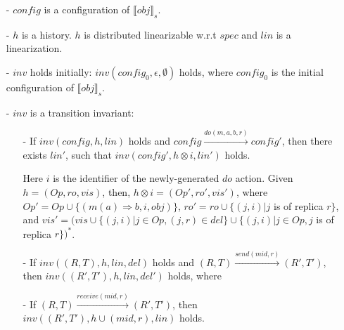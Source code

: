 \begin{itemize}
\setlength{\itemsep}{0.5pt}
\item[-] $\mathit{config}$ is a configuration of $\llbracket \mathit{obj} \rrbracket_s$.

\item[-] $h$ is a history. $h$ is distributed linearizable w.r.t $\mathit{spec}$ and $\mathit{lin}$ is a linearization.


\item[-] $\mathit{inv}$ holds initially: $\mathit{inv}(\mathit{config}_0,\epsilon,\emptyset)$ holds, where $\mathit{config}_0$ is the initial configuration of $\llbracket \mathit{obj} \rrbracket_s$. 

\item[-] $\mathit{inv}$ is a transition invariant:

    \begin{itemize}
    \setlength{\itemsep}{0.5pt}
    \item[-] If $\mathit{inv}(\mathit{config},h,\mathit{lin})$ holds and $\mathit{config} {\xrightarrow{\mathit{do}(m,a,b,r)}} \mathit{config}'$, then there exists $\mathit{lin}'$, such that $\mathit{inv}(\mathit{config}', h \otimes i, \mathit{lin}')$ holds.
        
        Here $i$ is the identifier of the newly-generated $\mathit{do}$ action. Given $h = (\mathit{Op},\mathit{ro},\mathit{vis})$, then, $h \otimes i = (\mathit{Op}',\mathit{ro}',\mathit{vis}')$, where $\mathit{Op}' = \mathit{Op} \cup \{ (m(a) \Rightarrow b,i,\mathit{obj}) \}$, $\mathit{ro}' = \mathit{ro} \cup \{ (j,i) \vert j$ is of replica $r \}$, and $\mathit{vis}' = (\mathit{vis} \cup \{ (j,i) \vert j \in \mathit{Op},(j,r) \in \mathit{del} \} \cup \{ (j,i) \vert j \in \mathit{Op}, j$ is of replica $r \})^*$.
    
    \item[-] If $\mathit{inv}((R,T),h,\mathit{lin},\mathit{del})$ holds and $(R,T) {\xrightarrow{\mathit{send}(\mathit{mid},r)}} (R',T')$, then $\mathit{inv}((R',T'),h,\mathit{lin},\mathit{del}')$ holds, where 
        
        

    \item[-] If $(R, T) {\xrightarrow{\mathit{receive}(\mathit{mid},r)}} (R', T')$, then $\mathit{inv}((R', T'),h \cup (\mathit{mid},r),\mathit{lin})$ holds.
    \end{itemize}
\end{itemize}

